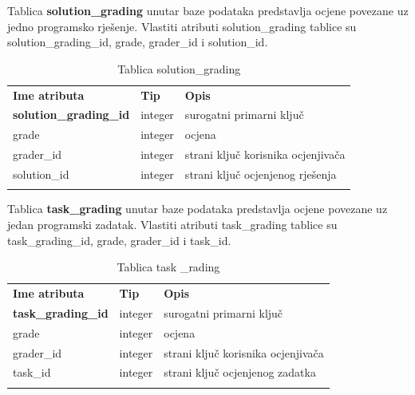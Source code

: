 \documentclass[times, utf8, zavrsni, numeric]{fer}
\begin{document}
		Tablica \textbf{solution\_grading} unutar baze podataka predstavlja ocjene povezane uz jedno programsko rješenje. Vlastiti atributi solution\_grading tablice su solution\_grading\_id, grade, grader\_id i solution\_id. 
		\begin{table}[H]
			\caption{Tablica solution\_grading}
			\label{tbl:solutiongrading}
			\centering
			\begin{tabu} to \textwidth {XXX}
				\tabucline[1.75pt]{-}
				\textbf{Ime atributa} & \textbf{Tip} & \textbf{Opis}\\ 				
				\tabucline[1.75pt]{-}
				\textbf{solution\_grading\_id} & integer & surogatni primarni ključ\\ \hline
				grade & integer & ocjena\\ \hline
				grader\_id & integer & strani ključ korisnika ocjenjivača\\ \hline
				solution\_id & integer & strani ključ ocjenjenog rješenja\\ \hline
				\tabucline[1.75pt]{-}
			\end{tabu}
		\end{table}
	
		Tablica \textbf{task\_grading} unutar baze podataka predstavlja ocjene povezane uz jedan programski zadatak. Vlastiti atributi task\_grading tablice su task\_grading\_id, grade, grader\_id i task\_id. 
		\begin{table}[H]
			\caption{Tablica task \_rading}
			\label{tbl:taskgrading}
			\centering
			\begin{tabu} to \textwidth {XXX}
				\tabucline[1.75pt]{-}
				\textbf{Ime atributa} & \textbf{Tip} & \textbf{Opis}\\ 				
				\tabucline[1.75pt]{-}
				\textbf{task\_grading\_id} & integer & surogatni primarni ključ\\ \hline
				grade & integer & ocjena\\ \hline
				grader\_id & integer & strani ključ korisnika ocjenjivača\\ \hline
				task\_id & integer & strani ključ ocjenjenog zadatka\\ \hline
				\tabucline[1.75pt]{-}
			\end{tabu}
		\end{table}
	
\end{document}
